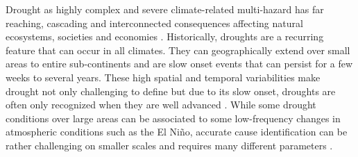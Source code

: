 {

Drought as highly complex and severe climate-related multi-hazard has far reaching, cascading and interconnected consequences affecting natural ecosystems, societies and economies \autocite{vereintenationenSpecialReportDrought2021}. Historically, droughts are a recurring feature that can occur in all climates. They can geographically extend over small areas to entire sub-continents and are slow onset events that can persist for a few weeks to several years. These high spatial and temporal variabilities make drought not only challenging to define but due to its slow onset, droughts are often only recognized when they are well advanced \autocite{idmpDroughtWaterScarcity2022,vereintenationenSpecialReportDrought2021}. While some drought conditions over large areas can be associated to some low-frequency changes in atmospheric conditions such as the El Niño, accurate cause identification can be rather challenging on smaller scales and requires many different parameters \autocite{botaiAnalysisDroughtProgression2019, vereintenationenSpecialReportDrought2021}.




}
